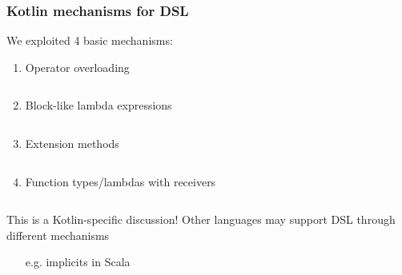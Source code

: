 \documentclass[presentation]{beamer}
\begin{document}
\begin{frame}[allowframebreaks]
    \frametitle{Kotlin mechanisms for DSL}

    We exploited 4 basic mechanisms:

    \medskip

    \begin{enumerate}
        \item Operator overloading
        \inputminted{kotlin}{code/Operators.kt}

        \framebreak

        \item Block-like lambda expressions
        \inputminted{kotlin}{code/Lambdas.kt}

        \item Extension methods
        \inputminted{kotlin}{code/Extensions.kt}

        \framebreak

        \item Function types/lambdas with receivers
        \inputminted{kotlin}{code/Receivers.kt}
    \end{enumerate}

    \framebreak

    \begin{alertblock}{This is a Kotlin-specific discussion!}
        Other languages may support DSL through different mechanisms
        \begin{itemize}
            \item[e.g.] implicits in Scala
        \end{itemize}
    \end{alertblock}

\end{frame}
\end{document}
